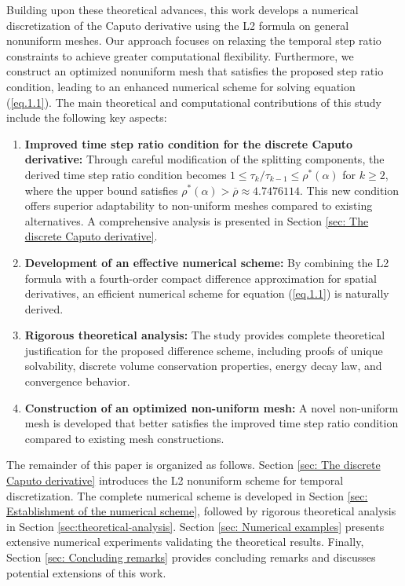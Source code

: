 \documentclass{siamart171218}
\theoremstyle{remark}
\theoremstyle{example}
\numberwithin{equation}{section}
\begin{document}
Building upon these theoretical advances, this work develops a numerical discretization of the Caputo derivative using the L2 formula on general nonuniform meshes. Our approach focuses on relaxing the temporal step ratio constraints to achieve greater computational flexibility. Furthermore, we construct an optimized nonuniform mesh that satisfies the proposed step ratio condition, leading to an enhanced numerical scheme for solving equation (\ref{eq.1.1}).
The main theoretical and computational contributions of this study include the following key aspects:
\begin{enumerate}
\item {\bf Improved time step ratio condition for the discrete Caputo derivative:} Through careful modification of the splitting components, the derived time step ratio condition becomes $1 \leq \tau_{k}/\tau_{k-1} \leq \rho^*(\alpha)$ for $k \geq 2$, where the upper bound satisfies $\rho^*(\alpha) > \overline{\rho} \approx 4.7476114$. This new condition offers superior adaptability to non-uniform meshes compared to existing alternatives. A comprehensive analysis is presented in Section \ref{sec: The discrete Caputo derivative}.
\item {\bf Development of an effective numerical scheme:} By combining the L2 formula with a fourth-order compact difference approximation for spatial derivatives, an efficient numerical scheme for equation (\ref{eq.1.1}) is naturally derived.

\item {\bf Rigorous theoretical analysis:} The study provides complete theoretical justification for the proposed difference scheme, including proofs of unique solvability, discrete volume conservation properties, energy decay law, and convergence behavior.

\item {\bf Construction of an optimized non-uniform mesh:} A novel non-uniform mesh is developed that better satisfies the improved time step ratio condition compared to existing mesh constructions.
\end{enumerate}

The remainder of this paper is organized as follows.
Section \ref{sec: The discrete Caputo derivative} introduces
 the L2 nonuniform scheme for temporal discretization.
 The complete numerical scheme is developed in
 Section \ref{sec: Establishment of the numerical scheme},
 followed by rigorous theoretical analysis in Section
\ref{sec:theoretical-analysis}.
Section \ref{sec: Numerical examples} presents extensive
numerical experiments validating the theoretical results.
Finally, Section \ref{sec: Concluding remarks} provides
concluding remarks and discusses potential extensions of this work.
\end{document}
